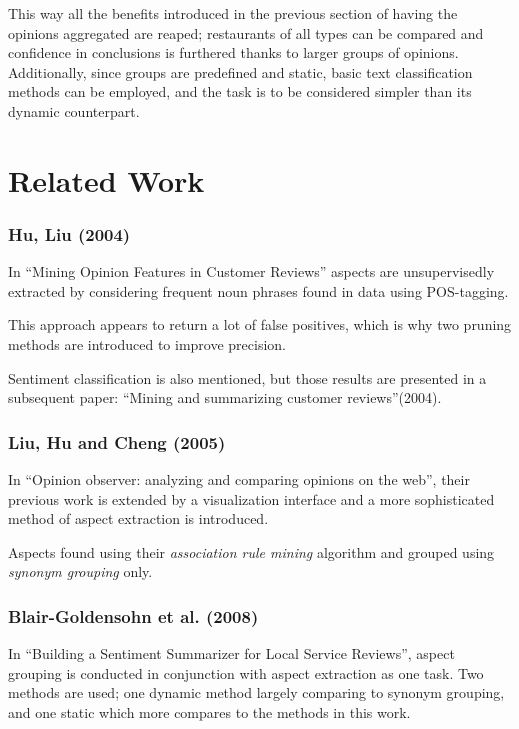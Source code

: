 \documentclass[a4paper,11pt]{kth-mag}
\begin{document}
This way all the benefits introduced in the previous section of having the opinions
aggregated are reaped; restaurants of all types can be compared and confidence in conclusions
is furthered thanks to larger groups of opinions.
Additionally, since groups are predefined and static,
basic text classification methods can be employed, and the task is to be considered
simpler than its dynamic counterpart.


\section{Related Work}

\subsubsection{Hu, Liu (2004)}
In ``Mining Opinion Features in Customer Reviews'' aspects are unsupervisedly
extracted by considering frequent noun phrases found in data using POS-tagging.

This approach appears to return a lot of false positives, which is why two pruning
methods are introduced to improve precision.

Sentiment classification is also mentioned, but those results are presented in a subsequent paper:
``Mining and summarizing customer reviews''(2004).


\subsubsection{Liu, Hu and Cheng (2005)}
In ``Opinion observer: analyzing and comparing opinions on the web'', their previous work is extended
by a visualization interface and a more sophisticated method of aspect extraction is introduced.

%
%

Aspects found using their \emph{association rule mining}\cite{ma1998integrating} algorithm
and grouped using \emph{synonym grouping} only. %

\subsubsection{Blair-Goldensohn et al. (2008)}
In ``Building a Sentiment Summarizer for Local Service Reviews'', aspect grouping is
conducted in conjunction with aspect extraction as one task.
Two methods are used; one dynamic method largely comparing to synonym grouping,
and one static which more compares to the methods in this work.
\end{document}
